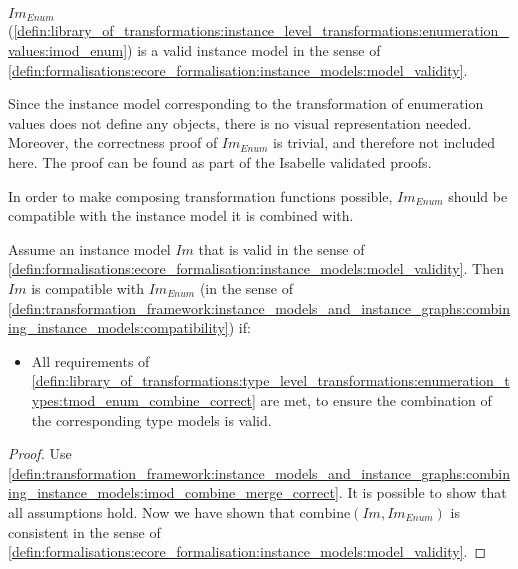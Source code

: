 \begin{thm}
\label{defin:library_of_transformations:instance_level_transformations:enumeration_values:imod_enum_correct}
$Im_{Enum}$ (\cref{defin:library_of_transformations:instance_level_transformations:enumeration_values:imod_enum}) is a valid instance model in the sense of \cref{defin:formalisations:ecore_formalisation:instance_models:model_validity}.
\end{thm}

Since the instance model corresponding to the transformation of enumeration values does not define any objects, there is no visual representation needed. Moreover, the correctness proof of $Im_{Enum}$ is trivial, and therefore not included here. The proof can be found as part of the Isabelle validated proofs.

In order to make composing transformation functions possible, $Im_{Enum}$ should be compatible with the instance model it is combined with.

\begin{thm}
\label{defin:library_of_transformations:instance_level_transformations:enumeration_values:imod_enum_combine_correct}
Assume an instance model $Im$ that is valid in the sense of \cref{defin:formalisations:ecore_formalisation:instance_models:model_validity}. Then $Im$ is compatible with $Im_{Enum}$ (in the sense of \cref{defin:transformation_framework:instance_models_and_instance_graphs:combining_instance_models:compatibility}) if:
\begin{itemize}
    \item All requirements of \cref{defin:library_of_transformations:type_level_transformations:enumeration_types:tmod_enum_combine_correct} are met, to ensure the combination of the corresponding type models is valid.
\end{itemize}
\end{thm}

\begin{proof}
Use \cref{defin:transformation_framework:instance_models_and_instance_graphs:combining_instance_models:imod_combine_merge_correct}. It is possible to show that all assumptions hold. Now we have shown that $\mathrm{combine}(Im, Im_{Enum})$ is consistent in the sense of \cref{defin:formalisations:ecore_formalisation:instance_models:model_validity}.
\end{proof}

